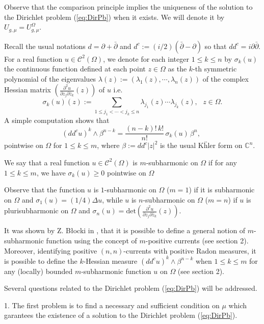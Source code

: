 \documentclass[12pt]{amsart}
\theoremstyle{definition}
\numberwithin{theorem}{section}
\numberwithin{equation}{section}
\newcommand{\C}{\mathbb{C}}
\begin{document}
Observe that the comparison principle implies the uniqueness of the solution to the Dirichlet problem  (\ref{eq:DirPb})  when it exists. We will denote it by $U_{g,\mu} = U^{\Omega}_{g,\mu}$.

Recall the usual notations $d = \partial + \bar{\partial}$ and $d^c := (i\slash 2)  ( \bar{\partial} - \partial)$ so  that
$dd^c = i  \partial  \bar{\partial}$.  For  a real function $u \in \mathcal{C}^2 (\Omega)$, we denote for each integer $1 \leq k \leq n$ by $\sigma_k (u)$ the continuous function defined 	at each point $z \in  \Omega$ as the $k$-th symmetric polynomial of the eigenvalues $\lambda (z) := (\lambda_1 (z), \cdots, \lambda_n(z))$ 
of the complex Hessian matrix $  \left(\frac{\partial^2 u }{\partial z_j \partial \bar{z}_k} (z)\right)$ of $u$ i.e. 
$$
\sigma_k (u) (z) := \sum_{1 \leq j_1 < \cdots < j_k \leq n} \lambda_{j_1} (z) \cdots \lambda_{j_k} (z), \, \,  \, \, z \in \Omega.
$$
A simple computation shows that  
$$
(dd^c u)^k \wedge \beta^{n - k} = \frac{(n-k)! \, k!}{n!}  \, \sigma_k (u)  \,  \beta^n, \, \, 
$$
pointwise on $\Omega$ for $1 \leq k \leq m$, where $\beta := dd^c \vert z\vert^2$ is the usual K\"hler form on $\C^n$.


We say that a real function $u \in \mathcal{C}^2 (\Omega)$ is $m$-subharmonic on $\Omega$ if for any $1 \leq k \leq m$, we have $\sigma_k (u) \geq 0$ pointwise  on $\Omega$

Observe that  the function $u$ is $1$-subharmonic  on $\Omega$ ($m= 1$) if it is  subharmonic on $\Omega$ and $\sigma_1 (u) = (1 \slash 4) \Delta u$, while $u$ is  $n$-subharmonic  on $\Omega$ ($m = n$) if  $u$ is  plurisubharmonic on $\Omega$ and $\sigma_n (u)  = \mathrm{det}  \left(\frac{\partial^2 u }{\partial z_j \partial \bar{z}_k} (z)\right)$.


It was shown by Z. B\l ocki  in \cite{Bl05}, that it is possible to define a general notion of $m$-subharmonic function using the concept of $m$-positive currents (see section 2). Moreover, identifying positive $(n,n)$-currents with positive Radon measures, it is possible to define the $k$-Hessian measure $(dd^c u)^k \wedge \beta^{n - k}$ when $1 \leq k \leq m$ for any (locally) bounded $m$-subharmonic function $u$ on $\Omega$ (see section 2). 

\smallskip

Several questions related to the Dirichlet problem  (\ref{eq:DirPb}) will be addressed.

1. The first problem is to find a necessary and sufficient condition on $\mu$ which garantees the existence of a solution to the Dirichlet problem (\ref{eq:DirPb}).
\end{document}
